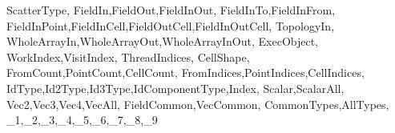{{                   ScatterType,
                   FieldIn,FieldOut,FieldInOut,
                   FieldInTo,FieldInFrom,
                   FieldInPoint,FieldInCell,FieldOutCell,FieldInOutCell,
                   TopologyIn,
                   WholeArrayIn,WholeArrayOut,WholeArrayInOut,
                   ExecObject,
                   WorkIndex,VisitIndex,
                   ThreadIndices,
                   CellShape,
                   FromCount,PointCount,CellCount,
                   FromIndices,PointIndices,CellIndices,
                   IdType,Id2Type,Id3Type,IdComponentType,Index,
                   Scalar,ScalarAll,
                   Vec2,Vec3,Vec4,VecAll,
                   FieldCommon,VecCommon,
                   CommonTypes,AllTypes,
                   _1,_2,_3,_4,_5,_6,_7,_8,_9
                   }
}
\lstset{language=VTKm}

\renewcommand{\lstlistlistingname}{List of Examples}
\renewcommand{\lstlistingname}{Example}

\newcommand*{\textcode}[1]{\texttt{#1}}
\newcommand*{\textnamespace}[1]{\textcode{\color{vtkmnamespace}{#1}}}
\newcommand*{\textmacro}[1]{\textcode{\color{vtkmmacro}{#1}}}
\newcommand*{\textidentifier}[1]{\textcode{\color{vtkmidentifier}{#1}}}
\newcommand*{\textsignature}[1]{\textcode{\color{vtkmsignature}{#1}}}

\newcommand*{\vtkmmacro}[1]{\textmacro{#1}\index{#1}}

\newcommand{\vtkmcontexport}{\vtkmmacro{VTKM\_CONT\_EXPORT}\index{export!control}\index{function~export}\index{method~export}\xspace}
\newcommand{\vtkmexecexport}{\vtkmmacro{VTKM\_EXEC\_EXPORT}\index{export!execution}\index{function~export}\index{method~export}\xspace}
\newcommand{\vtkmexeccontexport}{\vtkmmacro{VTKM\_EXEC\_CONT\_EXPORT}\index{export!control}\index{export!execution}\index{function~export}\index{method~export}\xspace}

\newcommand{\controlsignature}{\textsignature{ControlSignature}\index{control~signature}\index{signature!control}\xspace}
\newcommand{\executionsignature}{\textsignature{ExecutionSignature}\index{execution~signature}\index{signature!execution}\xspace}
\newcommand{\inputdomain}{\textsignature{InputDomain}\index{input~domain}\xspace}
\newcommand{\scattertype}{\textsignature{ScatterType}\index{scatter~type}\xspace}

